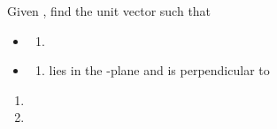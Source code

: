 \begin{ELexample}{}

Given , find the unit vector  such that

\begin{itemize}
\item
  \begin{enumerate}
  \def\labelenumi{(\alph{enumi})}
  \tightlist
  \item
  \end{enumerate}
\item
  \begin{enumerate}
  \def\labelenumi{(\alph{enumi})}
  \setcounter{enumi}{1}
  \tightlist
  \item
     lies in the -plane and is perpendicular to 
  \end{enumerate}
\end{itemize}

\begin{ELsolution}

\begin{enumerate}
\def\labelenumi{(\alph{enumi})}
\tightlist
\item
\item
\end{enumerate}

\end{ELsolution}

\end{ELexample}

\ELhold


